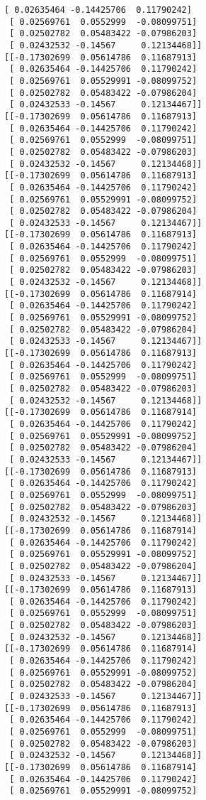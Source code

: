 \documentclass[11pt]{article}
\begin{document}
\begin{Verbatim}[commandchars=\\\{\}]
 [ 0.02635464 -0.14425706  0.11790242]
 [ 0.02569761  0.0552999  -0.08099751]
 [ 0.02502782  0.05483422 -0.07986203]
 [ 0.02432532 -0.14567     0.12134468]]
[[-0.17302699  0.05614786  0.11687913]
 [ 0.02635464 -0.14425706  0.11790242]
 [ 0.02569761  0.05529991 -0.08099752]
 [ 0.02502782  0.05483422 -0.07986204]
 [ 0.02432533 -0.14567     0.12134467]]
[[-0.17302699  0.05614786  0.11687913]
 [ 0.02635464 -0.14425706  0.11790242]
 [ 0.02569761  0.0552999  -0.08099751]
 [ 0.02502782  0.05483422 -0.07986203]
 [ 0.02432532 -0.14567     0.12134468]]
[[-0.17302699  0.05614786  0.11687913]
 [ 0.02635464 -0.14425706  0.11790242]
 [ 0.02569761  0.05529991 -0.08099752]
 [ 0.02502782  0.05483422 -0.07986204]
 [ 0.02432533 -0.14567     0.12134467]]
[[-0.17302699  0.05614786  0.11687913]
 [ 0.02635464 -0.14425706  0.11790242]
 [ 0.02569761  0.0552999  -0.08099751]
 [ 0.02502782  0.05483422 -0.07986203]
 [ 0.02432532 -0.14567     0.12134468]]
[[-0.17302699  0.05614786  0.11687914]
 [ 0.02635464 -0.14425706  0.11790242]
 [ 0.02569761  0.05529991 -0.08099752]
 [ 0.02502782  0.05483422 -0.07986204]
 [ 0.02432533 -0.14567     0.12134467]]
[[-0.17302699  0.05614786  0.11687913]
 [ 0.02635464 -0.14425706  0.11790242]
 [ 0.02569761  0.0552999  -0.08099751]
 [ 0.02502782  0.05483422 -0.07986203]
 [ 0.02432532 -0.14567     0.12134468]]
[[-0.17302699  0.05614786  0.11687914]
 [ 0.02635464 -0.14425706  0.11790242]
 [ 0.02569761  0.05529991 -0.08099752]
 [ 0.02502782  0.05483422 -0.07986204]
 [ 0.02432533 -0.14567     0.12134467]]
[[-0.17302699  0.05614786  0.11687913]
 [ 0.02635464 -0.14425706  0.11790242]
 [ 0.02569761  0.0552999  -0.08099751]
 [ 0.02502782  0.05483422 -0.07986203]
 [ 0.02432532 -0.14567     0.12134468]]
[[-0.17302699  0.05614786  0.11687914]
 [ 0.02635464 -0.14425706  0.11790242]
 [ 0.02569761  0.05529991 -0.08099752]
 [ 0.02502782  0.05483422 -0.07986204]
 [ 0.02432533 -0.14567     0.12134467]]
[[-0.17302699  0.05614786  0.11687913]
 [ 0.02635464 -0.14425706  0.11790242]
 [ 0.02569761  0.0552999  -0.08099751]
 [ 0.02502782  0.05483422 -0.07986203]
 [ 0.02432532 -0.14567     0.12134468]]
[[-0.17302699  0.05614786  0.11687914]
 [ 0.02635464 -0.14425706  0.11790242]
 [ 0.02569761  0.05529991 -0.08099752]
 [ 0.02502782  0.05483422 -0.07986204]
 [ 0.02432533 -0.14567     0.12134467]]
[[-0.17302699  0.05614786  0.11687913]
 [ 0.02635464 -0.14425706  0.11790242]
 [ 0.02569761  0.0552999  -0.08099751]
 [ 0.02502782  0.05483422 -0.07986203]
 [ 0.02432532 -0.14567     0.12134468]]
[[-0.17302699  0.05614786  0.11687914]
 [ 0.02635464 -0.14425706  0.11790242]
 [ 0.02569761  0.05529991 -0.08099752]

\end{Verbatim}
\end{document}
